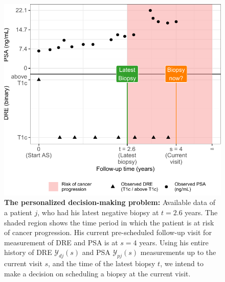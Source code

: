 \begin{figure}
\includegraphics{contents/c3/images/c3_fig1.pdf}
\caption{\textbf{The personalized decision-making problem:} Available data of a patient $j$, who had his latest negative biopsy at $t=2.6$ years. The shaded region shows the time period in which the patient is at risk of cancer progression. His current pre-scheduled follow-up visit for measurement of DRE and PSA is at $s=4$ years. Using his entire history of DRE $\mathcal{Y}_{dj}(s)$ and PSA $\mathcal{Y}_{pj}(s)$ measurements up to the current visit $s$, and the time of the latest biopsy $t$, we intend to make a decision on scheduling a biopsy at the current visit.}
\label{c3:fig:1}
\end{figure}